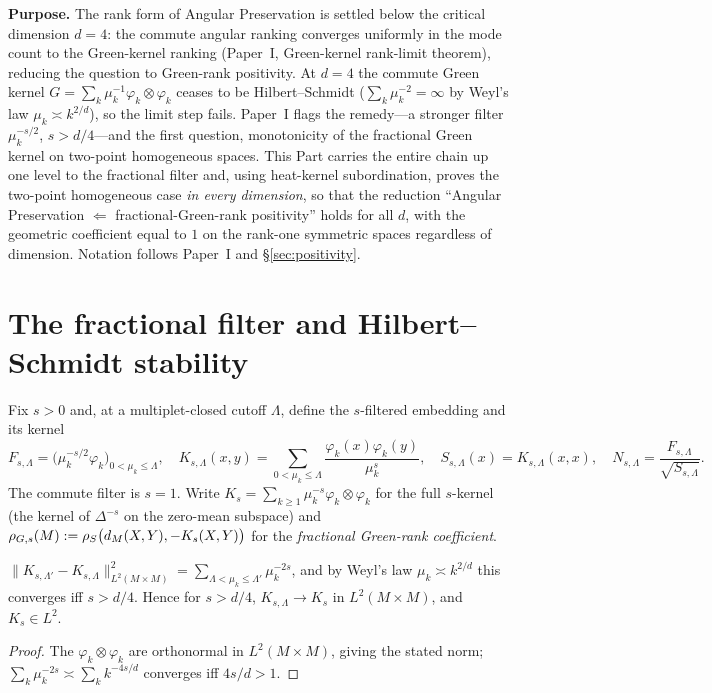 
\noindent\textbf{Purpose.} The rank form of Angular Preservation is settled below the
critical dimension $d=4$: the commute angular ranking converges uniformly in the mode
count to the Green-kernel ranking (Paper~I, Green-kernel rank-limit theorem), reducing the
question to Green-rank positivity. At $d=4$ the commute Green kernel
$G=\sum_k\mu_k^{-1}\varphi_k\otimes\varphi_k$ ceases to be Hilbert--Schmidt
($\sum_k\mu_k^{-2}=\infty$ by Weyl's law $\mu_k\asymp k^{2/d}$), so the limit step fails.
Paper~I flags the remedy---a stronger filter $\mu_k^{-s/2}$, $s>d/4$---and the first
question, monotonicity of the fractional Green kernel on two-point homogeneous spaces. This Part carries the entire chain up one level to the fractional filter and, using
heat-kernel subordination, proves the two-point homogeneous case \emph{in every dimension},
so that the reduction ``Angular Preservation $\Leftarrow$ fractional-Green-rank positivity''
holds for all $d$, with the geometric coefficient equal to $1$ on the rank-one symmetric
spaces regardless of dimension. Notation follows Paper~I and \S\ref{sec:positivity}.

\section{The fractional filter and Hilbert--Schmidt stability}

Fix $s>0$ and, at a multiplet-closed cutoff $\Lambda$, define the $s$-filtered embedding and
its kernel
\[
F_{s,\Lambda}=\bigl(\mu_k^{-s/2}\varphi_k\bigr)_{0<\mu_k\le\Lambda},\quad
K_{s,\Lambda}(x,y)=\!\!\sum_{0<\mu_k\le\Lambda}\!\!\frac{\varphi_k(x)\varphi_k(y)}{\mu_k^{s}},\quad
S_{s,\Lambda}(x)=K_{s,\Lambda}(x,x),\quad
N_{s,\Lambda}=\frac{F_{s,\Lambda}}{\sqrt{S_{s,\Lambda}}} .
\]
The commute filter is $s=1$. Write $K_s=\sum_{k\ge1}\mu_k^{-s}\varphi_k\otimes\varphi_k$ for
the full $s$-kernel (the kernel of $\Delta^{-s}$ on the zero-mean subspace) and
$\rho_{G,s}(M):=\rho_S\bigl(d_M(X,Y),-K_s(X,Y)\bigr)$ for the \emph{fractional Green-rank
coefficient}.

\begin{lemma}\label{lem:hs}
$\lVert K_{s,\Lambda'}-K_{s,\Lambda}\rVert_{L^2(M\times M)}^2=\sum_{\Lambda<\mu_k\le\Lambda'}\mu_k^{-2s}$,
and by Weyl's law $\mu_k\asymp k^{2/d}$ this converges iff $s>d/4$. Hence for $s>d/4$,
$K_{s,\Lambda}\to K_s$ in $L^2(M\times M)$, and $K_s\in L^2$.
\end{lemma}

\begin{proof}
The $\varphi_k\otimes\varphi_k$ are orthonormal in $L^2(M\times M)$, giving the stated norm;
$\sum_k\mu_k^{-2s}\asymp\sum_k k^{-4s/d}$ converges iff $4s/d>1$.
\end{proof}

